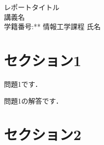 \documentclass[a4paper,11pt]{jsarticle}
\begin{document}
\begin{center}
{\huge レポートタイトル}\\ %
{\Large 講義名}\\ %
{\large 学籍番号:** 情報工学課程 氏名}\\ %
\end{center}

\section{セクション1}

\begin{problem}[1]
    問題1です．
\end{problem}

\begin{answer}
    問題1の解答です．
\end{answer}

\section{セクション2}
\end{document}
